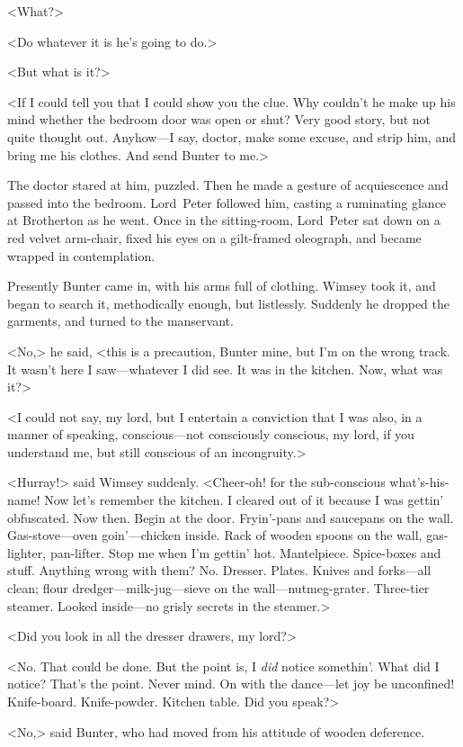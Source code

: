<What?>

<Do whatever it is he's going to do.>

<But what is it?>

<If I could tell you that I could show you the clue. Why couldn't he make up his mind whether the bedroom door was open or shut? Very good story, but not quite thought out. Anyhow—I say, doctor, make some excuse, and strip him, and bring me his clothes. And send Bunter to me.>

The doctor stared at him, puzzled. Then he made a gesture of acquiescence and passed into the bedroom. Lord~Peter followed him, casting a ruminating glance at Brotherton as he went. Once in the sitting-room, Lord~Peter sat down on a red velvet arm-chair, fixed his eyes on a gilt-framed oleograph, and became wrapped in contemplation.

Presently Bunter came in, with his arms full of clothing. Wimsey took it, and began to search it, methodically enough, but listlessly. Suddenly he dropped the garments, and turned to the manservant.

<No,> he said, <this is a precaution, Bunter mine, but I'm on the wrong track. It wasn't here I saw—whatever I did see. It was in the kitchen. Now, what was it?>

<I could not say, my lord, but I entertain a conviction that I was also, in a manner of speaking, conscious—not consciously conscious, my lord, if you understand me, but still conscious of an incongruity.>

<Hurray!> said Wimsey suddenly. <Cheer-oh! for the sub-conscious what's-his-name! Now let's remember the kitchen. I cleared out of it because I was gettin' obfuscated. Now then. Begin at the door. Fryin'-pans and saucepans on the wall. Gas-stove—oven goin'—chicken inside. Rack of wooden spoons on the wall, gas-lighter, pan-lifter. Stop me when I'm gettin' hot. Mantelpiece. Spice-boxes and stuff. Anything wrong with them? No. Dresser. Plates. Knives and forks—all clean; flour dredger—milk-jug—sieve on the wall—nutmeg-grater. Three-tier steamer. Looked inside—no grisly secrets in the steamer.>

<Did you look in all the dresser drawers, my lord?>

<No. That could be done. But the point is, I \textit{did} notice somethin'. What did I notice? That's the point. Never mind. On with the dance—let joy be unconfined! Knife-board. Knife-powder. Kitchen table. Did you speak?>

<No,> said Bunter, who had moved from his attitude of wooden deference.

